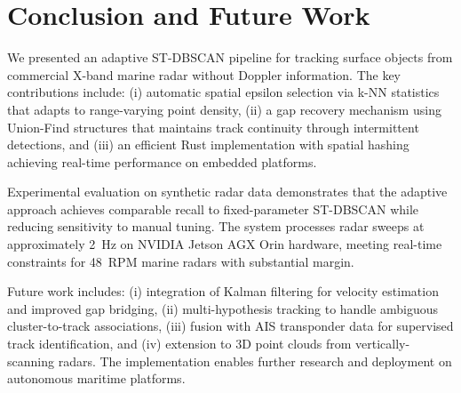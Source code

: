 \documentclass[conf]{new-aiaa}
\begin{document}
\section{Conclusion and Future Work}

We presented an adaptive ST-DBSCAN pipeline for tracking surface objects from commercial X-band marine radar without Doppler information. The key contributions include: (i) automatic spatial epsilon selection via k-NN statistics that adapts to range-varying point density, (ii) a gap recovery mechanism using Union-Find structures that maintains track continuity through intermittent detections, and (iii) an efficient Rust implementation with spatial hashing achieving real-time performance on embedded platforms.

Experimental evaluation on synthetic radar data demonstrates that the adaptive approach achieves comparable recall to fixed-parameter ST-DBSCAN while reducing sensitivity to manual tuning. The system processes radar sweeps at approximately 2~Hz on NVIDIA Jetson AGX Orin hardware, meeting real-time constraints for 48~RPM marine radars with substantial margin.

Future work includes: (i) integration of Kalman filtering for velocity estimation and improved gap bridging, (ii) multi-hypothesis tracking to handle ambiguous cluster-to-track associations, (iii) fusion with AIS transponder data for supervised track identification, and (iv) extension to 3D point clouds from vertically-scanning radars. The implementation enables further research and deployment on autonomous maritime platforms.
\end{document}
